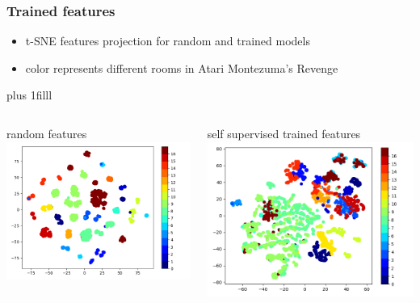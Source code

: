 \documentclass{beamer}
\begin{document}
\begin{frame}
  \frametitle{Trained features}
  
  \begin{itemize}
    \item t-SNE features projection for random and trained models
    \item color represents different rooms in Atari Montezuma's Revenge 
  \end{itemize} 

  \vskip 0pt plus 1filll 
  \begin{columns}
  
    \begin{column}{0.5\textwidth}
      random features
      \bigskip
      \includegraphics[scale=0.35]{../images/cnd_random.png}
    \end{column}

    \begin{column}{0.5\textwidth}
      self supervised trained features
      \bigskip
      \includegraphics[scale=0.35]{../images/cnd_trained.png}
    \end{column}
  
  \end{columns}
  
\end{frame}
\end{document}
